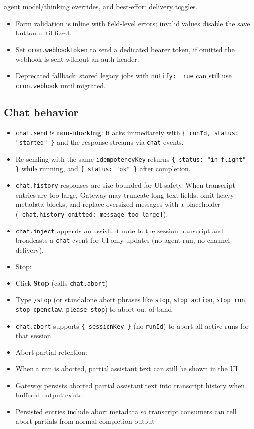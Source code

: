 agent model/thinking overrides, and best-effort delivery toggles.
\begin{itemize}
  \item Form validation is inline with field-level errors; invalid values disable the save button until fixed.
  \item Set \texttt{cron.webhookToken} to send a dedicated bearer token, if omitted the webhook is sent without an auth header.
  \item Deprecated fallback: stored legacy jobs with \texttt{notify: true} can still use \texttt{cron.webhook} until migrated.
\end{itemize}


\subsection{Chat behavior}


\begin{itemize}
  \item \texttt{chat.send} is \textbf{non-blocking}: it acks immediately with \texttt{\{ runId, status: "started" \}} and the response streams via \texttt{chat} events.
  \item Re-sending with the same \texttt{idempotencyKey} returns \texttt{\{ status: "in\_flight" \}} while running, and \texttt{\{ status: "ok" \}} after completion.
  \item \texttt{chat.history} responses are size-bounded for UI safety. When transcript entries are too large, Gateway may truncate long text fields, omit heavy metadata blocks, and replace oversized messages with a placeholder (\texttt{[chat.history omitted: message too large]}).
  \item \texttt{chat.inject} appends an assistant note to the session transcript and broadcasts a \texttt{chat} event for UI-only updates (no agent run, no channel delivery).
  \item Stop:
  \item Click \textbf{Stop} (calls \texttt{chat.abort})
  \item Type \texttt{/stop} (or standalone abort phrases like \texttt{stop}, \texttt{stop action}, \texttt{stop run}, \texttt{stop openclaw}, \texttt{please stop}) to abort out-of-band
  \item \texttt{chat.abort} supports \texttt{\{ sessionKey \}} (no \texttt{runId}) to abort all active runs for that session
  \item Abort partial retention:
  \item When a run is aborted, partial assistant text can still be shown in the UI
  \item Gateway persists aborted partial assistant text into transcript history when buffered output exists
  \item Persisted entries include abort metadata so transcript consumers can tell abort partials from normal completion output
\end{itemize}



